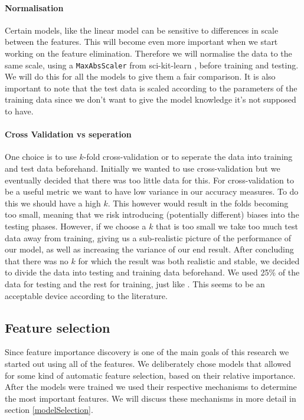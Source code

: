 \documentclass[british]{article}
\newcommand{\code}[1]{\texttt{#1}}
\begin{document}
	\paragraph{Normalisation} Certain models, like the linear model can be sensitive to differences in scale between the features. This will become even more important when we start working on the feature elimination. Therefore we will normalise the data to the same scale, using a \code{MaxAbsScaler} from sci-kit-learn \autocite{Pedregosa2012}, before training and testing. We will do this for all the models to give them a fair comparison. It is also important to note that the test data is scaled according to the parameters of the training data since we don't want to give the model knowledge it's not supposed to have. 
	
	\paragraph{Cross Validation vs seperation} One choice is to use $k$-fold cross-validation or to seperate the data into training and test data beforehand. Initially we wanted to use cross-validation but we eventually decided that there was too little data for this. For cross-validation to be a useful metric we want to have low variance in our accuracy measures. To do this we should have a high $k$. This however would result in the folds becoming too small, meaning that we risk introducing (potentially different) biases into the testing phases. However, if we choose a $k$ that is too small we take too much test data away from training, giving us a sub-realistic picture of the performance of our model, as well as increasing the variance of our end result. After concluding that there was no $k$ for which the result was both realistic and stable, we decided to divide the data into testing and training data beforehand. We used 25\% of the data for testing and the rest for training, just like \citeauthor{Candanedo2017}. This seems to be an acceptable device according to the literature. 
	
	\subsection{Feature selection}
	\label{featureSelection}
	Since feature importance discovery is one of the main goals of this research we started out using all of the features. We deliberately chose models that allowed for some kind of automatic feature selection, based on their relative importance. After the models were trained we used their respective mechanisms to determine the most important features. We will discuss these mechanisms in more detail in section \ref{modelSelection}.
	
\end{document}
